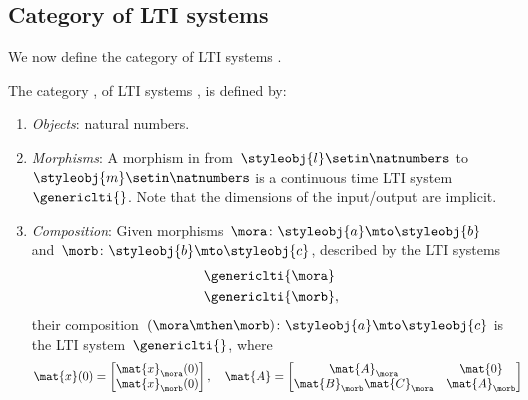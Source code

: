 \subsection{Category of LTI systems}
We now define the category of LTI systems \LTI.

\begin{ctdefinition}
    \label{def:LTICat}
    The category \LTI, of LTI systems \iindex{\LTI}, is defined by:
    \begin{enumerate}
        \item \emph{Objects}: natural numbers.
        \item \emph{Morphisms}: A morphism in \LTI from~$\styleobj{l}\setin \natnumbers$ to~$\styleobj{m}\setin \natnumbers$ is a continuous time LTI system~$\genericlti{}$.
              Note that the dimensions of the input/output are implicit.
        \item \emph{Composition}: Given morphisms~$\mora \colon \styleobj{a}\mto \styleobj{b}$ and~$\morb\colon \styleobj{b}\mto \styleobj{c}$, described by the LTI systems
              \begin{equation*}
                  \begin{aligned}
                       & \genericlti{\mora} \\
                       & \genericlti{\morb},
                  \end{aligned}
              \end{equation*}
              their composition~$(\mora \mthen \morb)\colon \styleobj{a}\mto \styleobj{c}$ is the LTI system~$\genericlti{}$, where
              \begin{equation}
                  \begin{aligned}
                      \mat{x}(0) & =\begin{bmatrix}
                                        \mat{x}_\mora(0) \\
                                        \mat{x}_\morb(0) \\
                                    \end{bmatrix},\quad
                      \mat{A}=\begin{bmatrix}
                                  \mat{A}_\mora              & \mat{0}       \\
                                  \mat{B}_\morb\mat{C}_\mora & \mat{A}_\morb

\end{bmatrix}
\end{aligned}
\end{equation}
\end{enumerate}
\end{ctdefinition}
